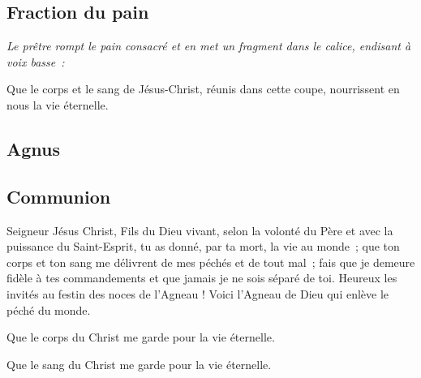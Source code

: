 \subsection{Fraction du pain}

\emph{Le prêtre rompt le pain consacré et en met un fragment dans le            
calice, endisant à voix basse~:}

Que le corps et le sang de Jésus-Christ, réunis dans cette coupe,
nourrissent en nous la vie éternelle.

\subsection{Agnus}



\subsection{Communion}


Seigneur Jésus Christ, Fils du Dieu vivant, selon la volonté du Père
et avec la puissance du Saint-Esprit, tu as donné, par ta mort, la vie
au monde~; que ton corps et ton sang me délivrent de mes péchés et de
tout mal~; fais que je demeure fidèle à tes commandements et que
jamais je ne sois séparé de toi.
Heureux les invités au festin des noces de l'Agneau !
Voici l'Agneau de Dieu qui enlève le péché du monde.


Que le corps du Christ me garde pour la vie éternelle.

Que le sang du Christ me garde pour la vie éternelle.


